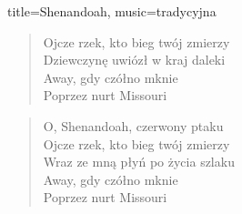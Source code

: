 \begin{song}{title={Shenandoah}, music={tradycyjna}}
\begin{verse}
        Ojcze rzek, kto bieg twój zmierzy \\
        Dziewczynę uwiózł w kraj daleki \\
        Away, gdy czółno mknie  \\
        Poprzez nurt Missouri
    \end{verse}    
    \begin{verse}
        O, Shenandoah, czerwony ptaku \\
        Ojcze rzek, kto bieg twój zmierzy \\
        Wraz ze mną płyń po życia szlaku \\
        Away, gdy czółno mknie  \\
        Poprzez nurt Missouri
    \end{verse}
\end{song}

